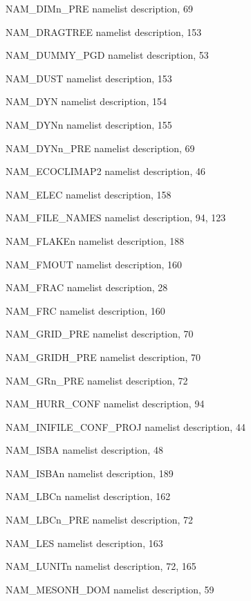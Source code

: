 \begin{theindex}
  \item NAM\_DIMn\_PRE
    \subitem namelist description,  69
  \item NAM\_DRAGTREE
    \subitem namelist description,  153
  \item NAM\_DUMMY\_PGD
    \subitem namelist description,  53
  \item NAM\_DUST
    \subitem namelist description,  153
  \item NAM\_DYN
    \subitem namelist description,  154
  \item NAM\_DYNn
    \subitem namelist description,  155
  \item NAM\_DYNn\_PRE
    \subitem namelist description,  69
  \item NAM\_ECOCLIMAP2
    \subitem namelist description,  46
  \item NAM\_ELEC
    \subitem namelist description,  158
  \item NAM\_FILE\_NAMES
    \subitem namelist description,  94, 123
  \item NAM\_FLAKEn
    \subitem namelist description,  188
  \item NAM\_FMOUT
    \subitem namelist description,  160
  \item NAM\_FRAC
    \subitem namelist description,  28
  \item NAM\_FRC
    \subitem namelist description,  160
  \item NAM\_GRID\_PRE
    \subitem namelist description,  70
  \item NAM\_GRIDH\_PRE
    \subitem namelist description,  70
  \item NAM\_GRn\_PRE
    \subitem namelist description,  72
  \item NAM\_HURR\_CONF
    \subitem namelist description,  94
  \item NAM\_INIFILE\_CONF\_PROJ
    \subitem namelist description,  44
  \item NAM\_ISBA
    \subitem namelist description,  48
  \item NAM\_ISBAn
    \subitem namelist description,  189
  \item NAM\_LBCn
    \subitem namelist description,  162
  \item NAM\_LBCn\_PRE
    \subitem namelist description,  72
  \item NAM\_LES
    \subitem namelist description,  163
  \item NAM\_LUNITn
    \subitem namelist description,  72, 165
  \item NAM\_MESONH\_DOM
    \subitem namelist description,  59

\end{theindex}
